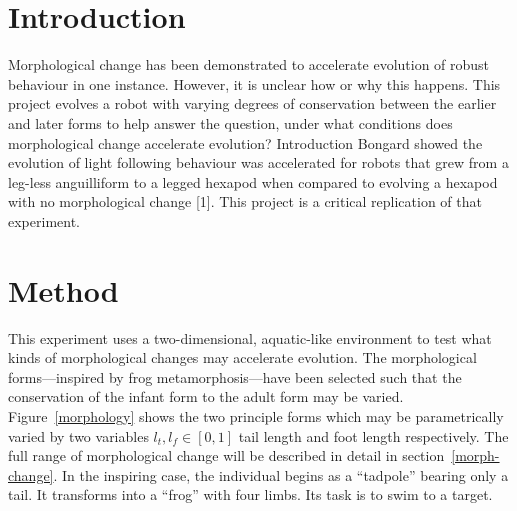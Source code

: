 \chapter{Introduction}

Morphological change has been demonstrated to accelerate evolution of
robust behaviour in one instance. However, it is unclear how or why
this happens. This project evolves a robot with varying degrees of
conservation between the earlier and later forms to help answer the
question, under what conditions does morphological change accelerate
evolution?  Introduction Bongard showed the evolution of light
following behaviour was accelerated for robots that grew from a
leg-less anguilliform to a legged hexapod when compared to evolving a
hexapod with no morphological change [1]. This project is a critical
replication of that experiment.

\chapter{Method}

This experiment uses a two-dimensional, aquatic-like environment to
test what kinds of morphological changes may accelerate evolution. The
morphological forms---inspired by frog metamorphosis---have been
selected such that the conservation of the infant form to the adult
form may be varied. Figure~\ref{morphology} shows the two principle
forms which may be parametrically varied by two variables $l_t, l_f
\in [0, 1]$ tail length and foot length respectively.  The full range
of morphological change will be described in detail in
section~\ref{morph-change}.  In the inspiring case, the individual
begins as a ``tadpole'' bearing only a tail. It transforms into a
``frog'' with four limbs. Its task is to swim to a target.

